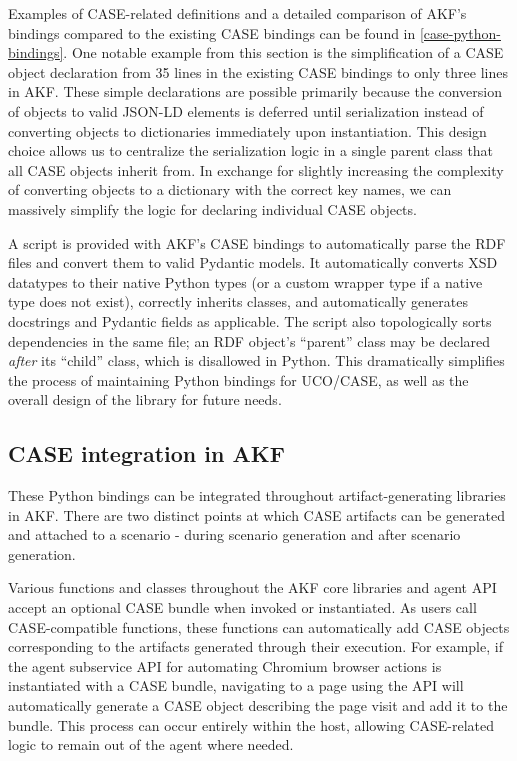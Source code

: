 \documentclass[letterpaper,12pt]{report}
\begin{document}
Examples of CASE-related definitions and a detailed comparison of AKF's
bindings compared to the existing CASE bindings can be found in
\autoref{case-python-bindings}. One notable example
from this section is the simplification of a CASE object declaration
from 35 lines in the existing CASE bindings to only three lines in AKF.
These simple declarations are possible primarily because the conversion
of objects to valid JSON-LD elements is deferred until serialization
instead of converting objects to dictionaries immediately upon
instantiation. This design choice allows us to centralize the
serialization logic in a single parent class that all CASE objects
inherit from. In exchange for slightly increasing the complexity of
converting objects to a dictionary with the correct key names, we can
massively simplify the logic for declaring individual CASE objects.

A script is provided with AKF's CASE bindings to automatically parse the
RDF files and convert them to valid Pydantic models. It automatically
converts XSD datatypes to their native Python types (or a custom wrapper
type if a native type does not exist), correctly inherits classes, and
automatically generates docstrings and Pydantic fields as applicable.
The script also topologically sorts dependencies in the same file; an
RDF object's ``parent'' class may be declared \emph{after} its ``child''
class, which is disallowed in Python. This dramatically simplifies the
process of maintaining Python bindings for UCO/CASE, as well as the
overall design of the library for future needs.

\subsection{CASE integration in
AKF}\label{case-integration-in-akf}

These Python bindings can be integrated throughout artifact-generating
libraries in AKF. There are two distinct points at which CASE artifacts
can be generated and attached to a scenario - during scenario generation
and after scenario generation.

Various functions and classes throughout the AKF core libraries and
agent API accept an optional CASE bundle when invoked or instantiated.
As users call CASE-compatible functions, these functions can
automatically add CASE objects corresponding to the artifacts generated
through their execution. For example, if the agent subservice API for
automating Chromium browser actions is instantiated with a CASE bundle,
navigating to a page using the API will automatically generate a CASE
object describing the page visit and add it to the bundle. This process
can occur entirely within the host, allowing CASE-related logic to
remain out of the agent where needed.
\end{document}
